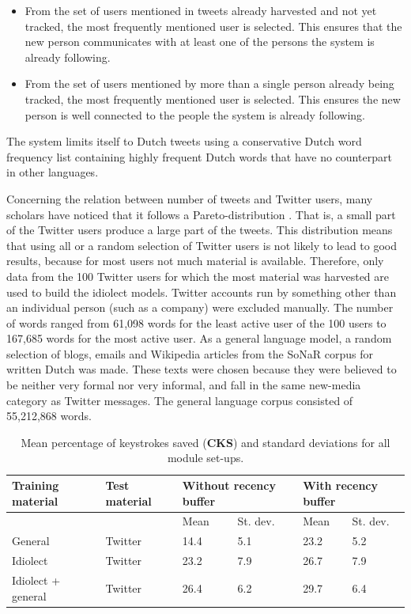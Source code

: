 \documentclass[12pt]{article}
\begin{document}
\begin{itemize}
\item From the set of users mentioned in tweets already harvested and not yet tracked, the most frequently mentioned user is selected. This ensures that the new person communicates with at least one of the persons the system is already following.
\item From the set of users mentioned by more than a single person already being tracked, the most frequently mentioned user is selected. This ensures the new person is well connected to the people the system is already following.
\end{itemize}

The system limits itself to Dutch tweets using a conservative Dutch word frequency list containing highly frequent Dutch words that have no counterpart in other languages.

Concerning the relation between number of tweets and Twitter users, many scholars have noticed that it follows a Pareto-distribution \cite{heil+09,asur+10,rui+12}. That is, a small part of the Twitter users produce a large part of the tweets. 
This distribution means that using all or a random selection of Twitter users is not likely to lead to good results, because for most users not much material is available. Therefore, only data from the 100 Twitter users for which the most material was harvested are used to build the idiolect models. Twitter accounts run by something other than an individual person (such as a company) were excluded manually. The number of words ranged from 61,098 words for the least active user of the 100 users to 167,685 words for the most active user. As a general language model, a random selection of blogs, emails and Wikipedia articles from the SoNaR corpus for written Dutch \cite{oostdijk+13} was made. These texts were chosen because they were believed to be neither very formal nor very informal, and fall in the same new-media category as Twitter messages. The general language corpus consisted of 55,212,868 words.

\begin{table}[htb] 
\centering
\begin{tabular}{ll|llll} 
Training material&Test material&\multicolumn{2}{l}{Without recency buffer}&\multicolumn{2}{l}{With recency buffer}\\
\hline
&&Mean&St. dev.&Mean&St. dev.\\
General&Twitter&14.4&5.1&23.2&5.2\\
Idiolect&Twitter&23.2&7.9&26.7&7.9\\
Idiolect + general &Twitter&26.4&6.2&29.7&6.4\\
\end{tabular} 
\caption{Mean percentage of keystrokes saved (\textbf{CKS}) and standard deviations for all module set-ups.} \label{twitter_results_cks}
\end{table}
\end{document}
